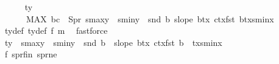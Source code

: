 \begin{isabellebody}
\ \ \ \ \isamarkupfalse%
\ {\isachardoublequoteopen}ty\ {\isasymge}\ \isanewline
\ \ \ \ \ \ {\isacharparenleft}{\kern0pt}MAX\ {\isacharparenleft}{\kern0pt}b{\isacharcomma}{\kern0pt}c{\isacharparenright}{\kern0pt}\ {\isasymin}\ S{}pr{\isachardot}{\kern0pt}\ s{}{\isacharunderscore}{\kern0pt}maxy\ {\isacharplus}{\kern0pt}\ s{}{\isacharunderscore}{\kern0pt}miny\ {\isacharminus}{\kern0pt}\ snd\ b\ {\isacharplus}{\kern0pt}{\isacharparenleft}{\kern0pt}slope\ {\isacharparenleft}{\kern0pt}b{\isacharplus}{\kern0pt}{\isacharparenleft}{\kern0pt}tx{\isacharcomma}{\kern0pt}{}{\isacharparenright}{\kern0pt}{\isacharparenright}{\kern0pt}\ {\isacharparenleft}{\kern0pt}c{\isacharplus}{\kern0pt}{\isacharparenleft}{\kern0pt}tx{\isacharcomma}{\kern0pt}{}{\isacharparenright}{\kern0pt}{\isacharparenright}{\kern0pt}{\isacharparenright}{\kern0pt}{\isacharasterisk}{\kern0pt}{\isacharparenleft}{\kern0pt}fst\ b{\isacharplus}{\kern0pt}tx{\isacharminus}{\kern0pt}s{}{\isacharunderscore}{\kern0pt}minx{\isacharparenright}{\kern0pt}{\isacharparenright}{\kern0pt}{\isachardoublequoteclose}\ \isanewline
\ \ \ \ \ \ \isamarkupfalse%
\ ty{\isacharunderscore}{\kern0pt}def\ ty{}{\isacharunderscore}{\kern0pt}def\ f{}\ m{}\ \isamarkupfalse%
\ fastforce\isanewline
\ \ \ \ \isamarkupfalse%
\ {\isachardoublequoteopen}ty\ {\isasymge}\ s{}{\isacharunderscore}{\kern0pt}maxy\ {\isacharplus}{\kern0pt}\ s{}{\isacharunderscore}{\kern0pt}miny\ {\isacharminus}{\kern0pt}\ snd\ b{}\ {\isacharplus}{\kern0pt}\ {\isacharparenleft}{\kern0pt}slope\ {\isacharparenleft}{\kern0pt}b{}{\isacharplus}{\kern0pt}{\isacharparenleft}{\kern0pt}tx{\isacharcomma}{\kern0pt}{}{\isacharparenright}{\kern0pt}{\isacharparenright}{\kern0pt}\ {\isacharparenleft}{\kern0pt}c{}{\isacharplus}{\kern0pt}{\isacharparenleft}{\kern0pt}tx{\isacharcomma}{\kern0pt}{}{\isacharparenright}{\kern0pt}{\isacharparenright}{\kern0pt}{\isacharparenright}{\kern0pt}{\isacharasterisk}{\kern0pt}{\isacharparenleft}{\kern0pt}fst\ b{}\ {\isacharplus}{\kern0pt}\ tx{\isacharminus}{\kern0pt}s{}{\isacharunderscore}{\kern0pt}minx{\isacharparenright}{\kern0pt}{\isachardoublequoteclose}\isanewline
\ \ \ \ \ \ \isamarkupfalse%
\ f{}\ s{}pr{\isacharunderscore}{\kern0pt}fin\ s{}pr{\isacharunderscore}{\kern0pt}ne\ \isamarkupfalse%

\end{isabellebody}
